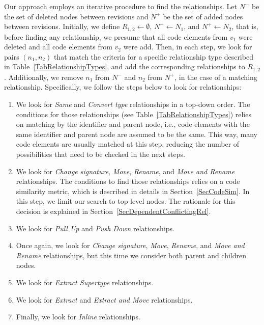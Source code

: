 Our approach employs an iterative procedure to find the relationships.
Let $N^-$ be the set of deleted nodes between revisions and $N^+$ be the set of added nodes between revisions.
Initially, we define $R_{1,2} \gets \emptyset$, $N^- \gets N_1$, and $N^+ \gets N_2$, that is, before finding any relationship, we presume that all code elements from $v_1$ were deleted and  all code elements from $v_2$ were add.
Then, in each step, we look for pairs $(n_1, n_2)$ that match the criteria for a specific relationship type described in Table~\ref{TabRelationshipTypes}, and add the corresponding relationships to $R_{1,2}$.
Additionally, we remove $n_1$ from $N^-$ and $n_2$ from $N^+$, in the case of a matching relationship.
Specifically, we follow the steps below to look for relationships:
\begin{enumerate}

\item We look for \textit{Same} and \textit{Convert type} relationships in a top-down order. The conditions for those relationships (see Table~\ref{TabRelationshipTypes}) relies on matching by the identifier and parent node, i.e., code elements with the same identifier and parent node are assumed to be the same.
This way, many code elements are usually matched at this step, reducing the number of possibilities that need to be checked in the next steps.

\item We look for \textit{Change signature}, \textit{Move}, \textit{Rename}, and \textit{Move and Rename} relationships.
The conditions to find those relationships relies on a code similarity metric, which is described in details in Section~\ref{SecCodeSim}.
In this step, we limit our search to top-level nodes.
The rationale for this decision is explained in Section~\ref{SecDependentConflictingRel}.

\item We look for \textit{Pull Up} and \textit{Push Down} relationships.

\item Once again, we look for \textit{Change signature}, \textit{Move}, \textit{Rename}, and \textit{Move and Rename} relationships, but this time we consider both parent and children nodes.

\item We look for \textit{Extract Supertype} relationships.

\item We look for \textit{Extract} and \textit{Extract and Move} relationships.

\item Finally, we look for \textit{Inline} relationships.

\end{enumerate}

